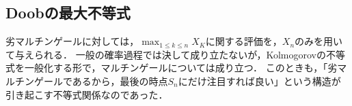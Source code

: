 \documentclass[uplatex,dvipdfmx]{jsreport}
\begin{document}
\subsection{Doobの最大不等式}

\begin{tcolorbox}[colframe=ForestGreen, colback=ForestGreen!10!white,breakable,colbacktitle=ForestGreen!40!white,coltitle=black,fonttitle=\bfseries\sffamily,
title=]
    劣マルチンゲールに対しては，$\max_{1\le k\le n}X_K$に関する評価を，$X_n$のみを用いて与えられる．
    一般の確率過程では決して成り立たないが，Kolmogorovの不等式を一般化する形で，マルチンゲールについては成り立つ．
    このときも，「劣マルチンゲールであるから，最後の時点$S_n$にだけ注目すれば良い」という構造が引き起こす不等式関係なのであった．
\end{tcolorbox}
\end{document}
